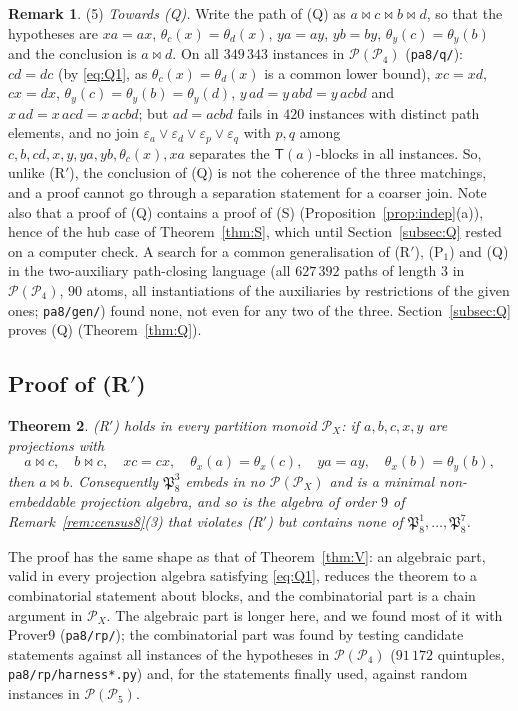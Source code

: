\documentclass[11pt]{amsart}
\newtheorem{theorem}{Theorem}[section]
\theoremstyle{definition}
\newtheorem{remark}[theorem]{Remark}
\renewcommand{\P}{\mathcal{P}}
\newcommand{\T}{\mathsf{T}}
\begin{document}
\begin{remark}
 (5) \emph{Towards (Q).} Write the path of (Q) as $a\bowtie c\bowtie b\bowtie d$, so that the hypotheses are $xa=ax$, $\theta_c(x)=\theta_d(x)$, $ya=ay$, $yb=by$, $\theta_y(c)=\theta_y(b)$ and the conclusion is $a\bowtie d$. On all $349\,343$ instances in $\P(\P_4)$ (\texttt{pa8/q/}): $cd=dc$ (by \eqref{eq:Q1}, as $\theta_c(x)=\theta_d(x)$ is a common lower bound), $xc=xd$, $cx=dx$, $\theta_y(c)=\theta_y(b)=\theta_y(d)$, $y\,ad=y\,abd=y\,acbd$ and $x\,ad=x\,acd=x\,acbd$; but $ad=acbd$ fails in $420$ instances with distinct path elements, and no join $\varepsilon_a\vee\varepsilon_d\vee\varepsilon_p\vee\varepsilon_q$ with $p,q$ among $c,b,cd,x,y,ya,yb,\theta_c(x),xa$ separates the $\T(a)$-blocks in all instances. So, unlike (R$'$), the conclusion of (Q) is not the coherence of the three matchings, and a proof cannot go through a separation statement for a coarser join. Note also that a proof of (Q) contains a proof of (S) (Proposition~\ref{prop:indep}(a)), hence of the hub case of Theorem~\ref{thm:S}, which until Section~\ref{subsec:Q} rested on a computer check. A search for a common generalisation of (R$'$), (P$_1$) and (Q) in the two-auxiliary path-closing language (all $627\,392$ paths of length $3$ in $\P(\P_4)$, $90$ atoms, all instantiations of the auxiliaries by restrictions of the given ones; \texttt{pa8/gen/}) found none, not even for any two of the three. Section~\ref{subsec:Q} proves (Q) (Theorem~\ref{thm:Q}).
\end{remark}


\subsection{Proof of (R$'$)}\label{subsec:Rp}

\begin{theorem}\label{thm:Rp}
(R$'$) holds in every partition monoid $\P_X$: if $a,b,c,x,y$ are projections with
\[
a\bowtie c,\quad b\bowtie c,\quad xc=cx,\quad \theta_x(a)=\theta_x(c),\quad ya=ay,\quad \theta_x(b)=\theta_y(b),
\]
then $a\bowtie b$. Consequently $\mathfrak P_8^3$ embeds in no $\P(\P_X)$ and is a minimal non-embeddable projection algebra, and so is the algebra of order $9$ of Remark~\ref{rem:census8}(3) that violates (R$'$) but contains none of $\mathfrak P_8^1,\dots,\mathfrak P_8^7$.
\end{theorem}

The proof has the same shape as that of Theorem~\ref{thm:V}: an algebraic part, valid in every projection algebra satisfying \eqref{eq:Q1}, reduces the theorem to a combinatorial statement about blocks, and the combinatorial part is a chain argument in $\P_X$. The algebraic part is longer here, and we found most of it with Prover9 (\texttt{pa8/rp/}); the combinatorial part was found by testing candidate statements against all instances of the hypotheses in $\P(\P_4)$ ($91\,172$ quintuples, \texttt{pa8/rp/harness*.py}) and, for the statements finally used, against random instances in $\P(\P_5)$.
\end{document}
